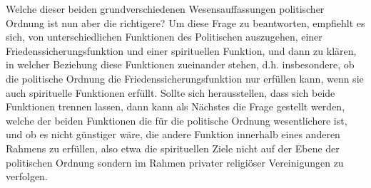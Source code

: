 Welche dieser beiden grundverschiedenen Wesensauffassungen politischer Ordnung
ist nun aber die richtigere? Um diese Frage zu beantworten, empfiehlt es sich,
von unterschiedlichen Funktionen des Politischen auszugehen, einer
Friedenssicherungsfunktion und einer spirituellen Funktion, und dann zu
klären, in welcher Beziehung diese Funktionen zueinander stehen, d.h. 
insbesondere, ob die politische Ordnung die Friedenssicherungsfunktion nur
erfüllen kann, wenn sie auch spirituelle Funktionen erfüllt. Sollte sich
herausstellen, dass sich beide Funktionen trennen lassen, dann kann als
Nächstes die Frage gestellt werden, welche der beiden Funktionen die für
die politische Ordnung wesentlichere ist, und ob es nicht günstiger
wäre, die andere Funktion innerhalb eines anderen Rahmens zu erfüllen,
also etwa die spirituellen Ziele nicht auf der Ebene der politischen Ordnung
sondern im Rahmen privater religiöser Vereinigungen zu verfolgen.  

